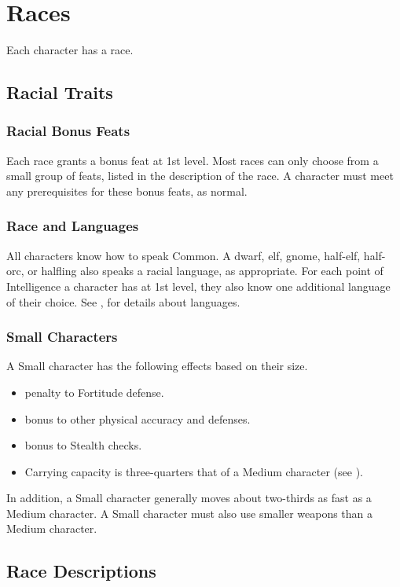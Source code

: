 \chapter{Races}\label{Races}

Each character has a race.

\section{Racial Traits}

\subsection{Racial Bonus Feats}
Each race grants a bonus feat at 1st level. Most races can only choose from a small group of feats, listed in the description of the race. A character must meet any prerequisites for these bonus feats, as normal.

\subsection{Race and Languages}
All characters know how to speak Common. A dwarf, elf, gnome, half-elf, half-orc, or halfling also speaks a racial language, as appropriate. For each point of Intelligence a character has at 1st level, they also know one additional language of their choice. See , for details about languages.

\subsection{Small Characters}\label{Small Characters}
A Small character has the following effects based on their size.
  \begin{itemize}
    \item {} penalty to Fortitude defense.
    \item {} bonus to other physical accuracy and defenses.
    \item {} bonus to Stealth checks.
    \item Carrying capacity is three-quarters that of a Medium character (see ).
  \end{itemize}

In addition, a Small character generally moves about two-thirds as fast as a Medium character. A Small character must also use smaller weapons than a Medium character.

\section{Race Descriptions}

